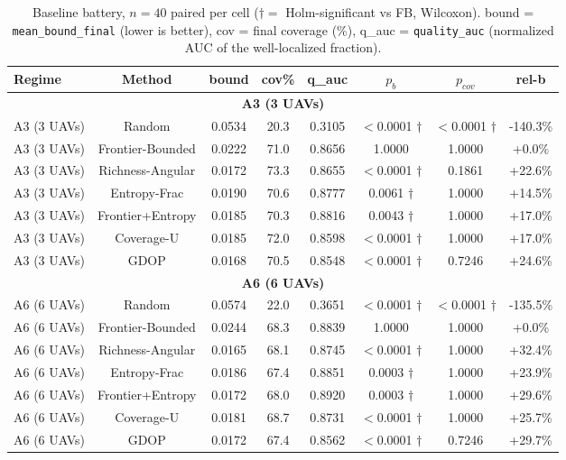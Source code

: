 \documentclass[journal]{IEEEtran}
\begin{document}
\begin{table}[t]
\caption{Baseline battery, $n = 40$ paired per cell ($\dagger =$ Holm-significant vs FB, Wilcoxon). bound = \texttt{mean\_bound\_final} (lower is better), cov = final coverage (\%), q\_auc = \texttt{quality\_auc} (normalized AUC of the well-localized fraction).}
\label{tab:base}
\centering
\begin{tabular}{l c c c c c c c}
\toprule
Regime & Method & bound & cov\% & q\_auc & $p_b$ & $p_{cov}$ & rel-b \\
\midrule
\multicolumn{8}{c}{\textbf{A3 (3 UAVs)}} \\
\midrule
A3 (3 UAVs) & Random & 0.0534 & 20.3 & 0.3105 & $<$0.0001 $\dagger$ & $<$0.0001 $\dagger$ & -140.3\% \\
A3 (3 UAVs) & Frontier-Bounded & 0.0222 & 71.0 & 0.8656 & 1.0000 & 1.0000 & +0.0\% \\
A3 (3 UAVs) & Richness-Angular & 0.0172 & 73.3 & 0.8655 & $<$0.0001 $\dagger$ & 0.1861 & +22.6\% \\
A3 (3 UAVs) & Entropy-Frac & 0.0190 & 70.6 & 0.8777 & 0.0061 $\dagger$ & 1.0000 & +14.5\% \\
A3 (3 UAVs) & Frontier+Entropy & 0.0185 & 70.3 & 0.8816 & 0.0043 $\dagger$ & 1.0000 & +17.0\% \\
A3 (3 UAVs) & Coverage-U & 0.0185 & 72.0 & 0.8598 & $<$0.0001 $\dagger$ & 1.0000 & +17.0\% \\
A3 (3 UAVs) & GDOP & 0.0168 & 70.5 & 0.8548 & $<$0.0001 $\dagger$ & 0.7246 & +24.6\% \\
\multicolumn{8}{c}{\textbf{A6 (6 UAVs)}} \\
\midrule
A6 (6 UAVs) & Random & 0.0574 & 22.0 & 0.3651 & $<$0.0001 $\dagger$ & $<$0.0001 $\dagger$ & -135.5\% \\
A6 (6 UAVs) & Frontier-Bounded & 0.0244 & 68.3 & 0.8839 & 1.0000 & 1.0000 & +0.0\% \\
A6 (6 UAVs) & Richness-Angular & 0.0165 & 68.1 & 0.8745 & $<$0.0001 $\dagger$ & 1.0000 & +32.4\% \\
A6 (6 UAVs) & Entropy-Frac & 0.0186 & 67.4 & 0.8851 & 0.0003 $\dagger$ & 1.0000 & +23.9\% \\
A6 (6 UAVs) & Frontier+Entropy & 0.0172 & 68.0 & 0.8920 & 0.0003 $\dagger$ & 1.0000 & +29.6\% \\
A6 (6 UAVs) & Coverage-U & 0.0181 & 68.7 & 0.8731 & $<$0.0001 $\dagger$ & 1.0000 & +25.7\% \\
A6 (6 UAVs) & GDOP & 0.0172 & 67.4 & 0.8562 & $<$0.0001 $\dagger$ & 0.7246 & +29.7\% \\

\end{tabular}
\end{table}
\end{document}
